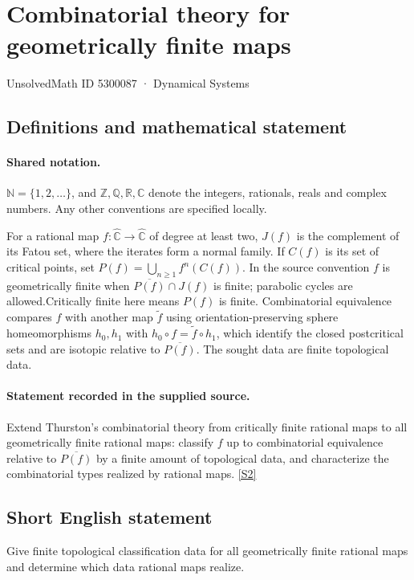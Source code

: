 \documentclass[11pt]{article}
\newcommand{\sref}[2]{\hyperlink{source:#1:#2}{[S#2]}}
\begin{document}
\setcounter{section}{5300086}
\section{Combinatorial theory for geometrically finite maps}\label{5300087}
{\small\sffamily UnsolvedMath ID 5300087 · Dynamical Systems}
\subsection{Definitions and mathematical statement}

\paragraph{Shared notation.}$\mathbb N=\{1,2,\ldots\}$, and $\mathbb Z,\mathbb Q,\mathbb R,\mathbb C$ denote the integers, rationals, reals and complex numbers. Any other conventions are specified locally.


For a rational map $f:\widehat{\mathbb C}\to\widehat{\mathbb C}$ of degree at least two, $J(f)$ is the complement of its Fatou set, where the iterates form a normal family. If $C(f)$ is its set of critical points, set $P(f)=\bigcup_{n\geq1}f^n(C(f))$. In the source convention $f$ is geometrically finite when $\overline{P(f)}\cap J(f)$ is finite; parabolic cycles are allowed.Critically finite here means $P(f)$ is finite. Combinatorial equivalence compares $f$ with another map $\widetilde f$ using orientation-preserving sphere homeomorphisms $h_0,h_1$ with $h_0\circ f=\widetilde f\circ h_1$, which identify the closed postcritical sets and are isotopic relative to $\overline{P(f)}$. The sought data are finite topological data.
\paragraph{Statement recorded in the supplied source.}
Extend Thurston’s combinatorial theory from critically finite rational maps to all geometrically finite rational maps: classify $f$ up to combinatorial equivalence relative to $\overline{P(f)}$ by a finite amount of topological data, and characterize the combinatorial types realized by rational maps. \sref{5300087}{2}
\subsection{Short English statement}
Give finite topological classification data for all geometrically finite rational maps and determine which data rational maps realize.
\end{document}
